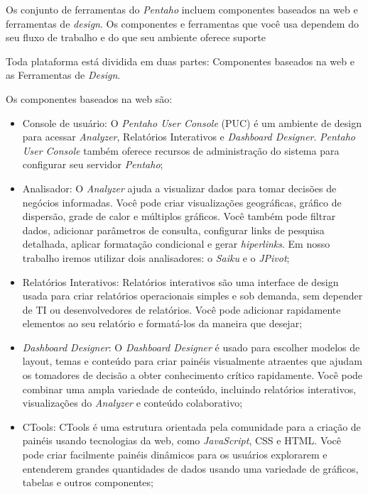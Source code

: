 Os conjunto de ferramentas do \textit{Pentaho} incluem componentes baseados na web e ferramentas de \textit{design}. Os componentes e 
ferramentas que você usa dependem do seu fluxo de trabalho e do que seu ambiente oferece suporte

Toda plataforma est\'{a} dividida em duas partes: Componentes baseados na web e as Ferramentas de \textit{Design}.

Os componentes baseados na web s\~{a}o:

\begin{itemize}
    \item Console de usu\'{a}rio: O \textit{Pentaho User Console} (PUC) \'{e} um ambiente de design para acessar \textit{Analyzer}, Relat\'orios Interativos e \textit{Dashboard Designer}. \textit{Pentaho User Console} tamb\'{e}m oferece recursos de administra\c{c}\~{a}o do sistema para configurar seu servidor \textit{Pentaho};
    \item Analisador: O \textit{Analyzer} ajuda a visualizar dados para tomar decis\~{o}es de neg\'ocios informadas. Você pode criar visualiza\c{c}\~{o}es geogr\'{a}ficas, gr\'{a}fico de dispers\~{a}o, grade de calor e múltiplos gr\'{a}ficos. Você tamb\'{e}m pode filtrar dados, adicionar par\^{a}metros de consulta, configurar links de pesquisa detalhada, aplicar formata\c{c}\~{a}o condicional e gerar \textit{hiperlinks}. Em nosso trabalho iremos utilizar dois analisadores: o \textit{Saiku} e o \textit{JPivot};
    \item Relat\'orios Interativos: Relat\'orios interativos s\~{a}o uma interface de design usada para criar relat\'orios operacionais simples e sob demanda, sem depender de TI ou desenvolvedores de relat\'orios. Você pode adicionar rapidamente elementos ao seu relat\'orio e format\'{a}-los da maneira que desejar;
    \item \textit{Dashboard Designer}: O \textit{Dashboard Designer} \'{e} usado para escolher modelos de layout, temas e conteúdo para criar pain\'{e}is visualmente atraentes que ajudam os tomadores de decis\~{a}o a obter conhecimento cr\'{i}tico rapidamente. Você pode combinar uma ampla variedade de conteúdo, incluindo relat\'orios interativos, visualiza\c{c}\~{o}es do \textit{Analyzer} e conteúdo colaborativo;
    \item CTools: CTools \'{e} uma estrutura orientada pela comunidade para a cria\c{c}\~{a}o de pain\'{e}is usando tecnologias da web, como \textit{JavaScript}, CSS e HTML. Você pode criar facilmente pain\'{e}is din\^{a}micos para os usu\'{a}rios explorarem e entenderem grandes quantidades de dados usando uma variedade de gr\'{a}ficos, tabelas e outros componentes;

\end{itemize}
